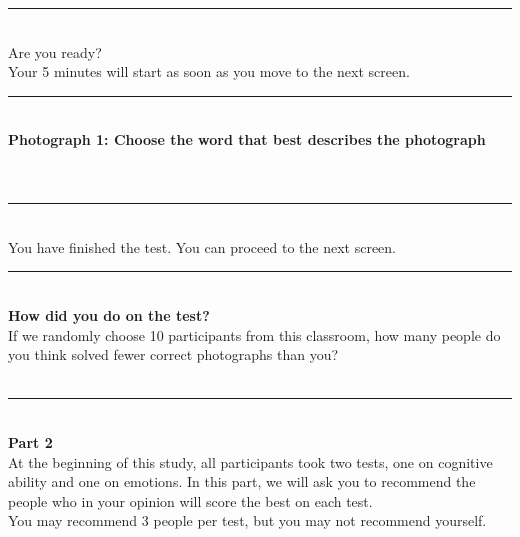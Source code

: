 \documentclass[11pt,a4paper,oneside]{article}
\begin{document}
\noindent\rule{\textwidth}{0.4pt}\\

\noindent Are you ready? \\
 
\noindent Your 5 minutes will start as soon as you move to the next screen. \\

\noindent\rule{\textwidth}{0.4pt}\\

\noindent \textbf{Photograph 1: Choose the word that best describes the photograph} \\

 \\

 \\

\noindent\rule{\textwidth}{0.4pt}\\

\noindent You have finished the test. You can proceed to the next screen. \\

\noindent\rule{\textwidth}{0.4pt}\\

\noindent \textbf{How did you do on the test?} \\

\noindent If we randomly choose 10 participants from this classroom, how many people do you think solved fewer correct photographs than you?\\

\\

\noindent\rule{\textwidth}{0.4pt}\\

\noindent \textbf{Part 2} \\
 
\noindent At the beginning of this study, all participants took two tests, one on cognitive ability and one on emotions. In this part, we will ask you to recommend the people who in your opinion will score the best on each test. \\

\noindent You may recommend 3 people per test, but you may not recommend yourself. \\
\end{document}
